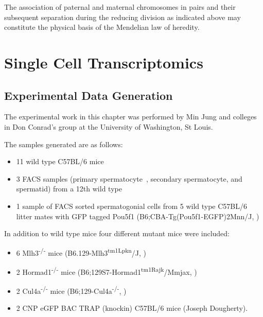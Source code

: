 \begin{savequote}[8cm]
The association of paternal and maternal chromosomes in pairs and their subsequent separation during the reducing division as indicated above may constitute the physical basis of the Mendelian law of heredity.
\end{savequote}

\chapter{\label{ch:2-SDA} Single Cell Transcriptomics}

\minitoc

\section{Experimental Data Generation}

The experimental work in this chapter was performed by Min Jung and colleges in Don Conrad's group at the University of Washington, St Louis.

The samples generated are as follows:

\begin{itemize}
	\item 11 wild type C57BL/6 mice
	\item 3 FACS samples (primary spermatocyte , secondary spermatocyte, and spermatid) from a 12th wild type
	\item 1 sample of FACS sorted spermatogonial cells from 5 wild type C57BL/6 litter mates with GFP tagged Pou5f1 (B6;CBA-Tg(Pou5f1-EGFP)2Mnn/J, \cite{Szabo2002Allelespecific})
\end{itemize}

In addition to wild type mice four different mutant mice were included:
\begin{itemize}
	\item 6 Mlh3\textsuperscript{-/-} mice (B6.129-Mlh3\textsuperscript{tm1Lpkn}/J, \cite{Lipkin2002Meiotic})
	\item 2 Hormad1\textsuperscript{-/-} mice (B6;129S7-Hormad1\textsuperscript{tm1Rajk}/Mmjax, \cite{Shin2010Hormad1})
	\item 2 Cul4a\textsuperscript{-/-} mice (B6;129-Cul4a\textsuperscript{-/-}, \cite{Yin2011E3})
	\item 2 CNP eGFP BAC TRAP (knockin) C57BL/6 mice (Joseph Dougherty).
\end{itemize}

